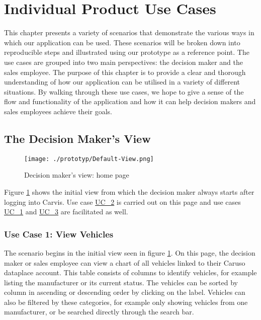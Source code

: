 \rmfamily

\section{Individual Product Use Cases}
This chapter presents a variety of scenarios that demonstrate the various ways in which our application can be used. These scenarios will be broken down into reproducible steps and illustrated using our prototype as a reference point. The use cases are grouped into two main perspectives: the decision maker and the sales employee. The purpose of this chapter is to provide a clear and thorough understanding of how our application can be utilised in a variety of different situations. By walking through these use cases, we hope to give a sense of the flow and functionality of the application and how it can help decision makers and sales employees achieve their goals.


\subsection{The Decision Maker's View}
\begin{figure}[H]
  \centering
  \texttt{[image: ./prototyp/Default-View.png]}
  \caption{Decision maker's view: home page}
  \label{DecisionMaker:Homepage}
\end{figure}

Figure \ref{DecisionMaker:Homepage} shows the initial view from which the decision maker always starts after logging into Carvis. Use case \hyperlink{Ref:UC2}{UC\_2} is carried out on this page and use cases \hyperlink{Ref:UC1}{UC\_1} and \hyperlink{Ref:UC3}{UC\_3} are facilitated as well. 


\subsubsection{Use Case 1: View Vehicles}
The scenario begins in the initial view seen in figure \ref{DecisionMaker:Homepage}. On this page, the decision maker or sales employee can view a chart of all vehicles linked to their Caruso dataplace account. This table consists of columns to identify vehicles, for example listing the manufacturer or its current status. The vehicles can be sorted by column in ascending or descending order by clicking on the label. Vehicles can also be filtered by these categories, for example only showing vehicles from one manufacturer, or be searched directly through the search bar.

